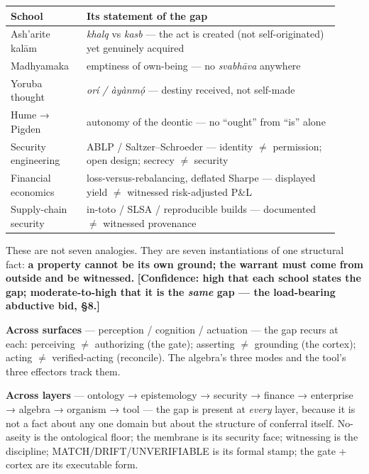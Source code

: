 \documentclass[11pt]{article}
\begin{document}
{\small\begin{longtable}{>{\raggedright\arraybackslash}p{0.214\linewidth}>{\raggedright\arraybackslash}p{0.706\linewidth}}
\toprule
\textbf{School} & \textbf{Its statement of the gap} \\ \midrule\endhead
Ash'arite kalām & \emph{khalq} vs \emph{kasb} — the act is created (not self-originated) yet genuinely acquired \\
Madhyamaka & emptiness of own-being — no \emph{svabhāva} anywhere \\
Yoruba thought & \emph{orí /\allowbreak{} àyànmọ́} — destiny received, not self-made \\
Hume → Pigden & autonomy of the deontic — no ``ought'' from ``is'' alone \\
Security engineering & ABLP /\allowbreak{} Saltzer–Schroeder — identity \ensuremath{\neq} permission; open design; secrecy \ensuremath{\neq} security \\
Financial economics & loss-versus-rebalancing, deflated Sharpe — displayed yield \ensuremath{\neq} witnessed risk-adjusted P\&L \\
Supply-chain security & in-toto /\allowbreak{} SLSA /\allowbreak{} reproducible builds — documented \ensuremath{\neq} witnessed provenance \\
\bottomrule\end{longtable}}

These are not seven analogies. They are seven instantiations of one structural fact: \textbf{a property cannot be its own ground; the warrant must come from outside and be witnessed.} \textbf{[Confidence: high that each school states the gap; moderate-to-high that it is the \emph{same} gap — the load-bearing abductive bid, §8.]}

\textbf{Across surfaces} — perception /\allowbreak{} cognition /\allowbreak{} actuation — the gap recurs at each: perceiving \ensuremath{\neq} authorizing (the gate); asserting \ensuremath{\neq} grounding (the cortex); acting \ensuremath{\neq} verified-acting (reconcile). The algebra's three modes and the tool's three effectors track them.

\textbf{Across layers} — ontology → epistemology → security → finance → enterprise → algebra → organism → tool — the gap is present at \emph{every} layer, because it is not a fact about any one domain but about the structure of conferral itself. No-aseity is the ontological floor; the membrane is its security face; witnessing is the discipline; MATCH/\allowbreak{}DRIFT/\allowbreak{}UNVERIFIABLE is its formal stamp; the gate + cortex are its executable form.
\end{document}
